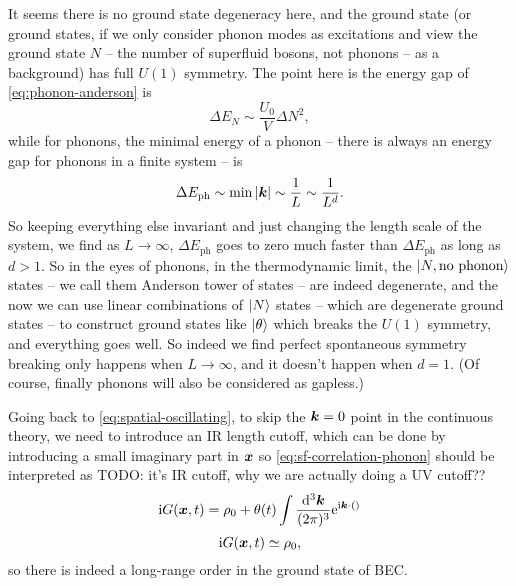 \documentclass[hyperref, a4paper]{article}
\newcommand*{\ii}{\mathrm{i}}
\newcommand*{\ee}{\mathrm{e}}
\begin{document}
\begin{enumerate}
It seems there is no ground state degeneracy here,
and the ground state 
(or ground states, 
if we only consider phonon modes as excitations and view the ground state $N$ 
-- the number of superfluid bosons, not phonons -- as a background) 
has full $U(1)$ symmetry.
The point here is the energy gap of \eqref{eq:phonon-anderson} is 
\begin{equation}
    \Delta E_N \sim \frac{U_0}{V} \Delta N^2,
\end{equation} 
while for phonons, the minimal energy of a phonon 
-- there is always an energy gap for phonons in a finite system -- 
is 
\begin{equation}
    \Delta E_{\text{ph}} \sim \min \abs{\vb*{k}} \sim \frac{1}{L} \sim \frac{1}{L^d}.
\end{equation}
So keeping everything else invariant and just changing the length scale of the system, 
we find as $L \to \infty$,
$\Delta E_\text{ph}$ goes to zero much faster than $\Delta E_{\text{ph}}$
as long as $d > 1$.
So in the eyes of phonons, 
in the thermodynamic limit, 
the $\ket{N, \text{no phonon}}$ states -- we call them Anderson tower of states -- are indeed degenerate,
and the now we can use linear combinations of $\ket{N}$ states -- which are degenerate ground states -- 
to construct ground states like $\ket{\theta}$ which breaks the $U(1)$ symmetry,
and everything goes well.
So indeed we find perfect spontaneous symmetry breaking only happens when $L \to \infty$,
and it doesn't happen when $d = 1$.
(Of course, finally phonons will also be considered as gapless.)

Going back to \eqref{eq:spatial-oscillating}, 
to skip the $\vb*{k} = 0$ point in the continuous theory,
we need to introduce an IR length cutoff, 
which can be done by introducing a small imaginary part in $\vb*{x}$
so \eqref{eq:sf-correlation-phonon} should be interpreted as TODO: it's IR cutoff, why we are actually doing a UV cutoff??
\begin{equation}
    \ii G(\vb*{x}, t) = \rho_0 + \theta(t) \int \frac{\dd[3]{\vb*{k}}}{(2\pi)^3} \ee^{\ii \vb*{k} \cdot ()}
\end{equation}
\begin{equation}
    \ii G(\vb*{x}, t) \simeq \rho_0,
\end{equation}
so there is indeed a long-range order in the ground state of BEC.


\end{enumerate}
\end{document}

